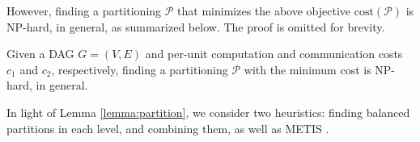 However, finding a partitioning $\mathcal{P}$ that minimizes the above objective
$\text{cost}(\mathcal{P})$ is NP-hard, in general, as summarized below. The proof
is omitted for brevity.

\begin{lemma}
\label{lemma:partition}
Given a DAG $G=(V, E)$ and per-unit computation and communication costs $c_1$ and $c_2$,
respectively, finding a partitioning $\mathcal{P}$ with the minimum cost is NP-hard, in general.
\end{lemma}

In light of Lemma \ref{lemma:partition}, we consider two heuristics: finding balanced
partitions in each level, and combining them, as well as METIS \cite{karypis:sijsc99}.



